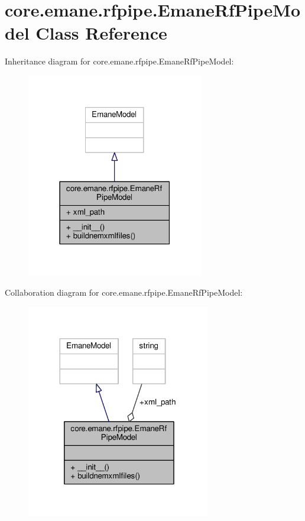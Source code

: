 \hypertarget{classcore_1_1emane_1_1rfpipe_1_1_emane_rf_pipe_model}{\section{core.\+emane.\+rfpipe.\+Emane\+Rf\+Pipe\+Model Class Reference}
\label{classcore_1_1emane_1_1rfpipe_1_1_emane_rf_pipe_model}
}


Inheritance diagram for core.\+emane.\+rfpipe.\+Emane\+Rf\+Pipe\+Model\+:
\nopagebreak
\begin{figure}[H]
\begin{center}
\leavevmode
\includegraphics[width=219pt]{classcore_1_1emane_1_1rfpipe_1_1_emane_rf_pipe_model__inherit__graph}
\end{center}
\end{figure}


Collaboration diagram for core.\+emane.\+rfpipe.\+Emane\+Rf\+Pipe\+Model\+:
\nopagebreak
\begin{figure}[H]
\begin{center}
\leavevmode
\includegraphics[width=227pt]{classcore_1_1emane_1_1rfpipe_1_1_emane_rf_pipe_model__coll__graph}
\end{center}
\end{figure}
